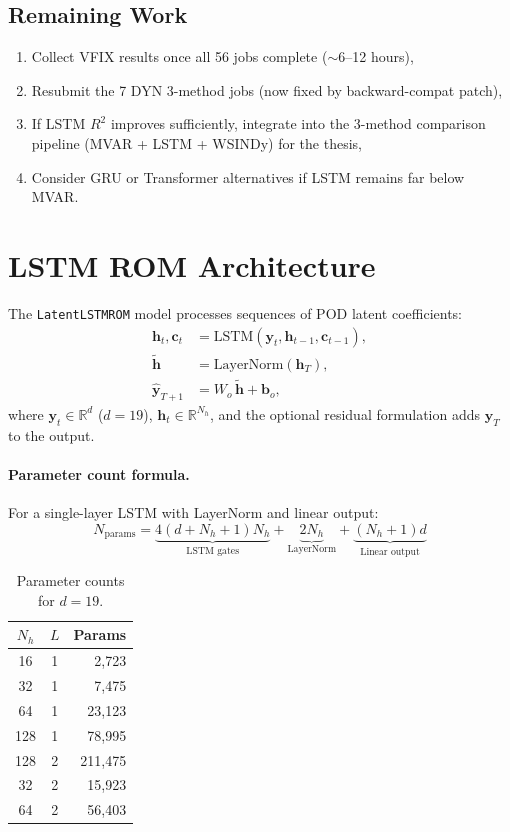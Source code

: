 \documentclass[11pt,letterpaper]{article}
\newcommand{\Rtwo}{R^2}
\begin{document}
\subsection{Remaining Work}
\begin{enumerate}[nosep]
  \item Collect VFIX results once all 56 jobs complete ($\sim$6--12 hours),
  \item Resubmit the 7 DYN 3-method jobs (now fixed by backward-compat patch),
  \item If LSTM $\Rtwo$ improves sufficiently, integrate into the 3-method comparison
        pipeline (MVAR + LSTM + WSINDy) for the thesis,
  \item Consider GRU or Transformer alternatives if LSTM remains far below MVAR.
\end{enumerate}


\appendix
\section{LSTM ROM Architecture}
\label{app:architecture}

The \texttt{LatentLSTMROM} model processes sequences of POD latent coefficients:
\begin{align}
  \mathbf{h}_t, \mathbf{c}_t &= \text{LSTM}(\mathbf{y}_t, \mathbf{h}_{t-1}, \mathbf{c}_{t-1}), \\
  \tilde{\mathbf{h}} &= \text{LayerNorm}(\mathbf{h}_T), \\
  \hat{\mathbf{y}}_{T+1} &= W_o\,\tilde{\mathbf{h}} + \mathbf{b}_o,
\end{align}
where $\mathbf{y}_t \in \mathbb{R}^d$ ($d=19$), $\mathbf{h}_t \in \mathbb{R}^{N_h}$,
and the optional residual formulation adds $\mathbf{y}_T$ to the output.

\paragraph{Parameter count formula.}
For a single-layer LSTM with LayerNorm and linear output:
\begin{equation}
  N_\text{params} = \underbrace{4(d + N_h + 1)N_h}_{\text{LSTM gates}} 
                   + \underbrace{2N_h}_{\text{LayerNorm}}
                   + \underbrace{(N_h + 1)d}_{\text{Linear output}}
\end{equation}

\begin{table}[H]
\centering
\caption{Parameter counts for $d=19$.}
\label{tab:params}
\small
\begin{tabular}{@{}ccr@{}}
\toprule
$N_h$ & $L$ & Params \\
\midrule
16  & 1 & 2,723 \\
32  & 1 & 7,475 \\
64  & 1 & 23,123 \\
128 & 1 & 78,995 \\
128 & 2 & 211,475 \\
32  & 2 & 15,923 \\
64  & 2 & 56,403 \\
\bottomrule
\end{tabular}
\end{table}
\end{document}
